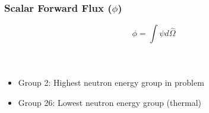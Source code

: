 \documentclass[t]{beamer}
\begin{document}
\begin{frame}
  \frametitle{Scalar Forward Flux ($\phi$)}
  \vskip-0.25in
  \begin{equation}
    \phi = \int\psi d\hat{\Omega}
  \end{equation}
  \vskip-0.25in
  \begin{columns}
    \begin{figure}
    \end{figure}
    \begin{figure}
    \end{figure}
  \end{columns}
  \begin{itemize}
    \item Group 2: Highest neutron energy group in problem
    \item Group 26: Lowest neutron energy group (thermal)
  \end{itemize}
\end{frame}
\end{document}
